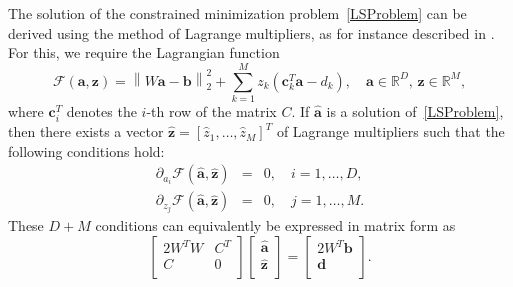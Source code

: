 \documentclass{svjour3}
\begin{document}
The solution of the constrained minimization problem~\eqref{LSProblem} can be derived using the method of Lagrange multipliers, as for instance described in \cite{boyd2018introduction}. For this, we require the Lagrangian function
\begin{equation*}
    \mathcal{F}(\boldsymbol{a},\boldsymbol{z})=\left\lVert W\boldsymbol{a}-\boldsymbol{b}\right\rVert_2^2+\sum_{k=1}^Mz_k\left(\boldsymbol{c}_k^T\boldsymbol{a}-d_k\right), \quad \boldsymbol{a}\in\mathbb{R}^D, \, \boldsymbol{z}\in\mathbb{R}^M,
\end{equation*} 
where $\boldsymbol{c}_i^T$ denotes the $i$-th row of the matrix $C$.
If $\hat{\boldsymbol{a}}$ is a solution of~\eqref{LSProblem}, then there exists a vector $\hat{\boldsymbol{z}}=\left[\hat{z}_1,\dots,\hat{z}_{M}\right]^T$ of Lagrange multipliers such that the following conditions hold:
\begin{eqnarray*}
    {\partial_{a_i} \mathcal{F}}\left(\hat{\boldsymbol{a}},\hat{\boldsymbol{z}}\right)&=&0, \quad i=1,\dots,D,\\
    {\partial_{z_j} \mathcal{F}}\left(\hat{\boldsymbol{a}},\hat{\boldsymbol{z}}\right)&=&0,\quad j=1,\dots,M.
\end{eqnarray*}
These $D + M$ conditions can equivalently be expressed in matrix form as
\begin{equation}\label{LagrangeMultmethod}
	\begin{bmatrix}
		2 W^T W & C^T  \\
		C & 0  \\
	\end{bmatrix}
	\begin{bmatrix}
		\hat{\boldsymbol{a}} \\
		\hat{\boldsymbol{z}} \\
	\end{bmatrix}=
	\begin{bmatrix}
		2 W^T\boldsymbol{b} \\
		\boldsymbol{d} \\
	\end{bmatrix}.
\end{equation}
\end{document}
